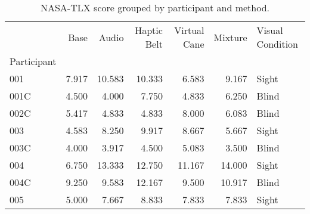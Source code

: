 
\begin{table}[!htb]
\centering
\caption{NASA-TLX score grouped by participant and method.}
\label{tab:nasa_average}
\begin{tabular}{lrrrrrl}
\toprule
{} &  Base &  Audio &  Haptic Belt &  Virtual Cane &  Mixture & Visual Condition \\
Participant &       &        &              &               &          &                  \\
\midrule
001         & 7.917 & 10.583 &       10.333 &         6.583 &    9.167 &            Sight \\
001C        & 4.500 &  4.000 &        7.750 &         4.833 &    6.250 &            Blind \\
002C        & 5.417 &  4.833 &        4.833 &         8.000 &    6.083 &            Blind \\
003         & 4.583 &  8.250 &        9.917 &         8.667 &    5.667 &            Sight \\
003C        & 4.000 &  3.917 &        4.500 &         5.083 &    3.500 &            Blind \\
004         & 6.750 & 13.333 &       12.750 &        11.167 &   14.000 &            Sight \\
004C        & 9.250 &  9.583 &       12.167 &         9.500 &   10.917 &            Blind \\
005         & 5.000 &  7.667 &        8.833 &         7.833 &    7.833 &            Sight \\
\bottomrule
\end{tabular}
\end{table}

